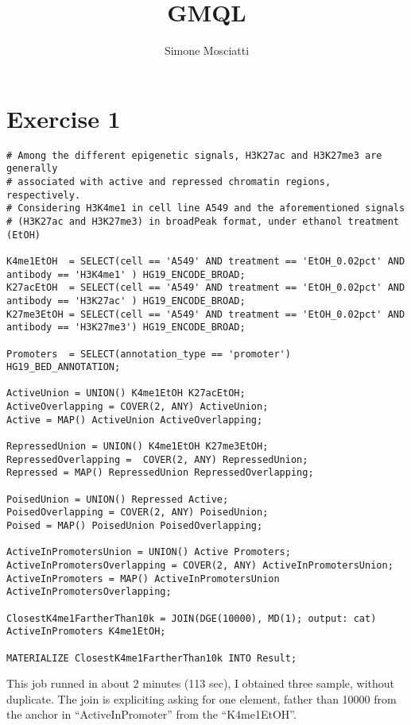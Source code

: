 \documentclass[11pt]{article} %
\title{GMQL}
\author{Simone Mosciatti}
\begin{document}
\maketitle

\section{Exercise 1}

\begin{lstlisting}
# Among the different epigenetic signals, H3K27ac and H3K27me3 are generally 
# associated with active and repressed chromatin regions, respectively. 
# Considering H3K4me1 in cell line A549 and the aforementioned signals 
# (H3K27ac and H3K27me3) in broadPeak format, under ethanol treatment (EtOH)

K4me1EtOH  = SELECT(cell == 'A549' AND treatment == 'EtOH_0.02pct' AND antibody == 'H3K4me1' ) HG19_ENCODE_BROAD;
K27acEtOH  = SELECT(cell == 'A549' AND treatment == 'EtOH_0.02pct' AND antibody == 'H3K27ac' ) HG19_ENCODE_BROAD;
K27me3EtOH = SELECT(cell == 'A549' AND treatment == 'EtOH_0.02pct' AND antibody == 'H3K27me3') HG19_ENCODE_BROAD;

Promoters  = SELECT(annotation_type == 'promoter') HG19_BED_ANNOTATION;

ActiveUnion = UNION() K4me1EtOH K27acEtOH;
ActiveOverlapping = COVER(2, ANY) ActiveUnion;
Active = MAP() ActiveUnion ActiveOverlapping;

RepressedUnion = UNION() K4me1EtOH K27me3EtOH;
RepressedOverlapping =  COVER(2, ANY) RepressedUnion;
Repressed = MAP() RepressedUnion RepressedOverlapping;

PoisedUnion = UNION() Repressed Active;
PoisedOverlapping = COVER(2, ANY) PoisedUnion;
Poised = MAP() PoisedUnion PoisedOverlapping;

ActiveInPromotersUnion = UNION() Active Promoters;
ActiveInPromotersOverlapping = COVER(2, ANY) ActiveInPromotersUnion;
ActiveInPromoters = MAP() ActiveInPromotersUnion ActiveInPromotersOverlapping;

ClosestK4me1FartherThan10k = JOIN(DGE(10000), MD(1); output: cat) ActiveInPromoters K4me1EtOH;

MATERIALIZE ClosestK4me1FartherThan10k INTO Result;
\end{lstlisting}

This job runned in about 2 minutes (113 sec), I obtained three sample, without duplicate.
The join is expliciting asking for one element, father than 10000 from the anchor in ``ActiveInPromoter'' from the ``K4me1EtOH''.
\end{document}

